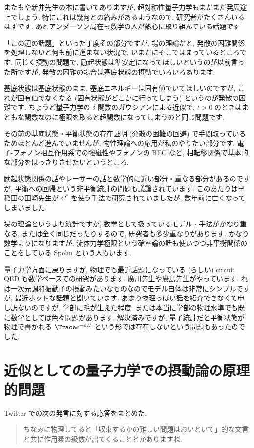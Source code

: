 \documentclass[openany, a4paper, oneside]{jsbook}
\begin{document}
またもや新井先生の本に書いてありますが, 超対称性量子力学もまだまだ発展途上でしょう.
特にこれは幾何との絡みがあるようなので, 研究者がたくさんいるはずです.
あとアンダーソン局在も数学の人が熱心に取り組んでいる話題です

「この辺の話題」といった丁度その部分ですが, 場の理論だと,
発散の困難関係を処理しないと何も前に進まない状況で, いまだにそこではまっているところです.
同じく摂動の問題で, 励起状態は準安定になってほしいというのが以前言った所ですが,
発散の困難の場合は基底状態の摂動でいろいろあります.

基底状態は基底状態のまま, 基底エネルギーは固有値でいてほしいのですが,
これが固有値でなくなる (固有状態がどこかに行ってしまう) というのが発散の困難です.
ちょうど量子力学の $\delta$ 関数のガウシアンによる近似で,
$t>0$ のときはまともな関数なのに極限を取ると超関数になってしまうのと同じ問題です.

その前の基底状態・平衡状態の存在証明 (発散の困難の回避) で手間取っているためほとんど進んでいませんが,
物性理論への応用が私のやりたい部分です.
電子-フォノン相互作用系での強磁性やフォノンの BEC など, 相転移関係で基本的な部分をはっきりさせたいというところ.

励起状態関係の話やレーザーの話と数学的に近い部分・重なる部分があるのですが,
平衡への回帰という非平衡統計の問題も議論されています.
このあたりは早稲田の田崎先生が $C^*$ を使う手法で研究されていましたが, 数年前に亡くなってしまいました.

場の理論というより統計ですが, 数学として扱っているモデル・手法がかなり重なる,
または全く同じだったりするので, 研究者も多少重なりがあります.
かなり数学よりになりますが, 流体力学極限という確率論の話も使いつつ非平衡関係のことをしている Spohn という人もいます.

量子力学方面に戻りますが, 物理でも最近話題になっている (らしい) circuit QED も数学ベースでの研究があります.
廣川先生や廣島先生がやっています.
れは一次元調和振動子の摂動みたいなものなのでモデル自体は非常にシンプルですが, 最近ホットな話題と聞いています.
あまり物理っぽい話を紹介できなくて申し訳ないのですが,
学部に毛が生えた程度, または本当に学部の物理水準でも既に数学としては色々問題があります.
解決済みですが, 量子統計だと平衡状態が物理で書かれる $\Trace e^{- \beta H}$ という形では存在しないという問題もあったのでした.
\chapter{近似としての量子力学での摂動論の原理的問題}

Twitter での次の発言に対する応答をまとめた.
\begin{quote}
ちなみに物理してると「収束するかの難しい問題はおいといて」的な文言と共に作用素の級数が出てくることとかありますね.
\end{quote}
\end{document}
